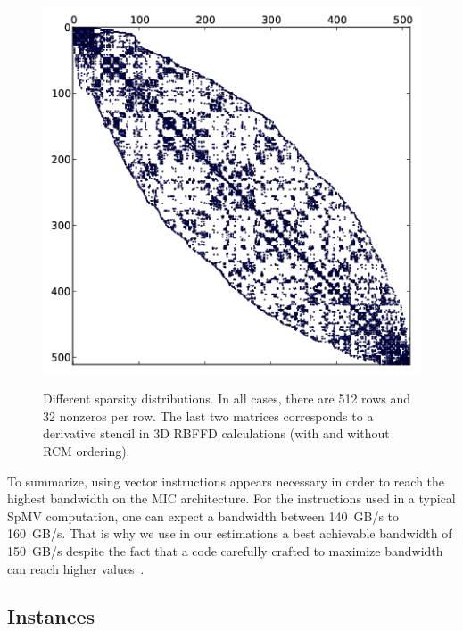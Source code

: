 \documentclass[10pt,conference,compsocconf]{IEEEtran}
\begin{document}
\begin{figure}[t]
\begin{center}
{      \includegraphics[width=\ww]{figures/kd-tree-3d-rcm-crop.png}}%
  \end{center}
  
  \caption{Different sparsity distributions. In all cases, there are
    512 rows and 32 nonzeros per row. The last two matrices
    corresponds to a derivative stencil in 3D RBFFD
    calculations (with and without RCM ordering).}
  \label{fig:spy_plots}
\end{figure}

To summarize, using vector instructions appears necessary in order
to reach the highest bandwidth on the MIC architecture. For the instructions used
in a typical SpMV computation, one can expect a bandwidth between
140~GB/s to 160~GB/s. That is why we use in our estimations a best
achievable bandwidth of 150~GB/s despite the fact that a 
 code carefully crafted to maximize bandwidth can reach higher
values~\cite{Saule13-ARXIV}. 

\subsection{Instances}
\end{document}
